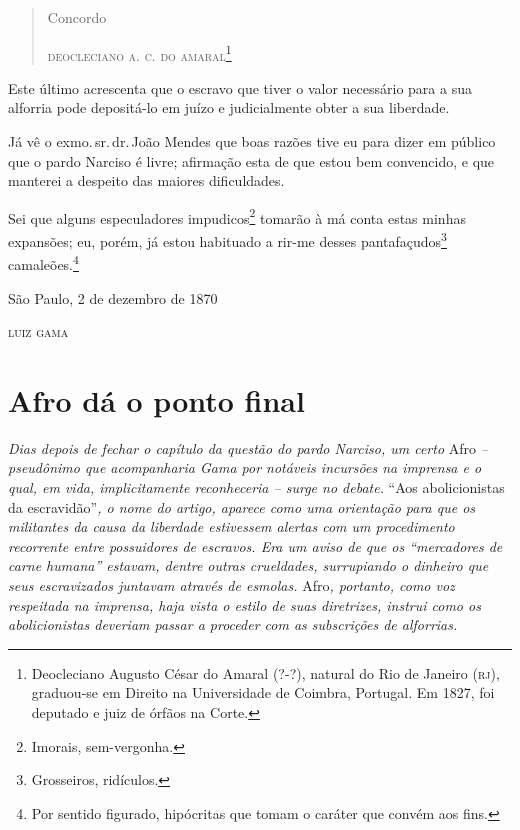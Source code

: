 \begin{quote}
Concordo

\begin{flushright}
\textsc{deocleciano a. c. do amaral}\footnote{ Deocleciano Augusto César do
  Amaral (?-?), natural do Rio de Janeiro (\textsc{rj}), graduou-se em Direito na
  Universidade de Coimbra, Portugal. Em 1827, foi deputado e juiz de
  órfãos na Corte.}
\end{flushright}
\end{quote}

Este último acrescenta que o escravo que tiver o valor necessário para a
sua alforria pode depositá-lo em juízo e judicialmente obter a sua
liberdade.

Já vê o exmo.\,sr.\,dr.\,João Mendes que boas razões tive eu para dizer em
público que o pardo Narciso é livre; afirmação esta de que estou bem
convencido, e que manterei a despeito das maiores dificuldades.

Sei que alguns especuladores impudicos\footnote{ Imorais,
  sem-vergonha.} tomarão à má conta estas minhas expansões; eu, porém,
já estou habituado a rir-me desses pantafaçudos\footnote{
  Grosseiros, ridículos.} camaleões.\footnote{
  Por sentido figurado, hipócritas que tomam o caráter que convém aos
  fins.}

\begin{flushright}
São Paulo, 2 de dezembro de 1870

\textsc{luiz gama}
\end{flushright}

\part{Afro dá o ponto final}

\begin{argumento}
\emph{Dias depois de fechar o capítulo da questão do pardo Narciso, um
certo} Afro \emph{-- pseudônimo que acompanharia Gama por notáveis
incursões na imprensa e o qual, em vida, implicitamente reconheceria --
surge no debate.} ``Aos abolicionistas da escravidão''\emph{, o nome do
artigo, aparece como uma orientação para que os militantes da causa da
liberdade estivessem alertas com um procedimento recorrente entre
possuidores de escravos. Era um aviso de que os ``mercadores de carne
humana'' estavam, dentre outras crueldades, surrupiando o dinheiro que
seus escravizados juntavam através de esmolas.} Afro\emph{, portanto,
como voz respeitada na imprensa, haja vista o estilo de suas diretrizes,
instrui como os abolicionistas deveriam passar a proceder com as
subscrições de alforrias.}
\end{argumento}

